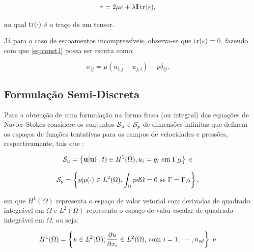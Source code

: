 \documentclass[_ArquivoPrincipal.tex]{subfiles}
\begin{document}
\begin{equation}
    \mathbf{\tau}=2\mu\dot{\mathbf{\varepsilon}}+\lambda\mathbf{I}\mathop{\mathrm{tr}}\nolimits(\dot{\mathbf{\varepsilon}})\text{,}
\end{equation}

\noindent no qual $\mathop{\mathrm{tr}}\nolimits(\cdot)$ é o traço de um tensor.

Já para o caso de escoamentos incompressíveis, observa-se que $\mathop{\mathrm{tr}}\nolimits(\dot{\mathbf{\varepsilon}})=0$, fazendo com que \ref{eq:const1} possa ser escrita como:

\begin{equation}
    \sigma_{ij}=\mu(u_{i,j}+u_{j,i})-p\delta_{ij}\text{.}\label{eq:ModConst}
\end{equation}

\subsection{Formulação Semi-Discreta} \label{FSD}

Para a obtenção de uma formulação na forma fraca (ou integral) das equações de Navier-Stokes considere os conjuntos $\mathcal{S}_u$ e $\mathcal{S}_p$ de dimensões infinitas que definem os espaços de funções tentativas para os campos de velocidades e pressões, respectivamente, tais que \cite{bazilevs2013computational,fernandes2020tecnica}:

\begin{equation}
    \mathcal{S}_u=\left\{\mathbf{u}|\mathbf{u}(\cdot,t)\in H^1(\Omega),u_i=g_i\text{ em }\Gamma_D\right\}\text{ e}
\end{equation}

\begin{equation}
    \mathcal{S}_p=\left\{p|p(\cdot)\in L^2(\Omega),\int_\Omega{pd\Omega}=0\text{ se }\Gamma=\Gamma_D\right\}\text{,}
\end{equation}

\noindent em que $H^1(\Omega)$ representa o espaço de valor vetorial com derivadas de quadrado integrável em $\Omega$ e $L^2(\Omega)$ representa o espaço de valor escalar de quadrado integrável em $\Omega$, ou seja:

\begin{equation}
    H^1(\Omega)=\left\{u\in L^2(\Omega);\frac{\partial{u}}{\partial{x_i}}\in L^2(\Omega)\text{, com }i=1,\cdots,n_{sd}\right\}\text{ e}
\end{equation}
\end{document}
